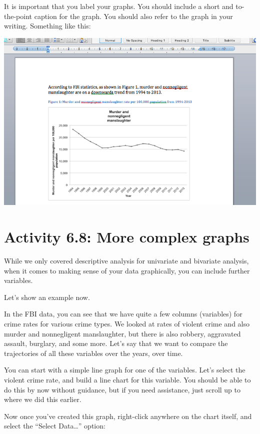 \documentclass[
]{book}
\begin{document}
It is important that you label your graphs. You should include a short and to-the-point caption for the graph. You should also refer to the graph in your writing. Something like this:

\includegraphics{imgs/ref_and_caption.png}

\hypertarget{activity-6.8-more-complex-graphs}{%
\section{Activity 6.8: More complex graphs}\label{activity-6.8-more-complex-graphs}}

While we only covered descriptive analysis for univariate and bivariate analysis, when it comes to making sense of your data graphically, you can include further variables.

Let's show an example now.

In the FBI data, you can see that we have quite a few columns (variables) for crime rates for various crime types. We looked at rates of violent crime and also murder and nonnegligent manslaughter, but there is also robbery, aggravated assault, burglary, and some more. Let's say that we want to compare the trajectories of all these variables over the years, over time.

You can start with a simple line graph for one of the variables. Let's select the violent crime rate, and build a line chart for this variable. You should be able to do this by now without guidance, but if you need assistance, just scroll up to where we did this earlier.

Now once you've created this graph, right-click anywhere on the chart itself, and select the ``Select Data\ldots{}'' option:
\end{document}
